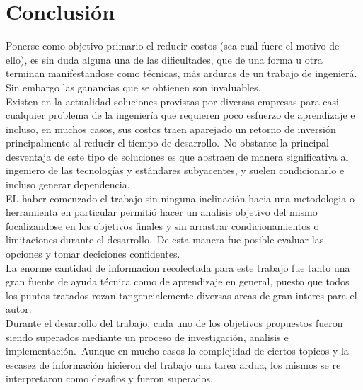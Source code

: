 \chapter{Conclusi\'on}

Ponerse como objetivo primario el reducir costos (sea cual fuere el motivo de
ello), es sin duda alguna una de las dificultades, que de una forma u otra
terminan manifestandose como t\'ecnicas, m\'as arduras de un trabajo de
ingenier\'a. Sin embargo las ganancias que se obtienen son invaluables.\\

Existen en la actualidad soluciones provistas por diversas empresas para casi
cualquier problema de la ingenier\'ia que requieren poco esfuerzo de
aprendizaje e incluso, en muchos casos, sus costos traen aparejado un retorno
de inversi\'on principalmente al reducir el tiempo de desarrollo.\
No obstante la principal desventaja de este tipo de soluciones es que abstraen
de manera significativa al ingeniero de las tecnolog\'ias y est\'andares
subyacentes, y suelen condicionarlo e incluso generar dependencia.\\

EL haber comenzado el trabajo sin ninguna inclinaci\'on hacia una metodologia
o herramienta en particular permiti\'o hacer un analisis objetivo del mismo
focalizandose en los objetivos finales y sin arrastrar condicionamientos
o limitaciones durante el desarrollo.\ 
De esta manera fue posible evaluar las opciones y tomar deciciones
confidentes.\\

La enorme cantidad de informacion recolectada para este trabajo fue tanto una
gran fuente de ayuda t\'ecnica como de aprendizaje en general, puesto que
todos los puntos tratados rozan tangencialemente diversas areas de gran
interes para el autor.\\

Durante el desarrollo del trabajo, cada uno de los objetivos propuestos fueron
siendo superados mediante un proceso de investigaci\'on, analisis e
implementaci\'on.\
Aunque en mucho casos la complejidad de ciertos topicos y la escasez de
informaci\'on hicieron del trabajo una tarea ardua, los mismos se re
interpretaron como desafios y fueron superados.\\




